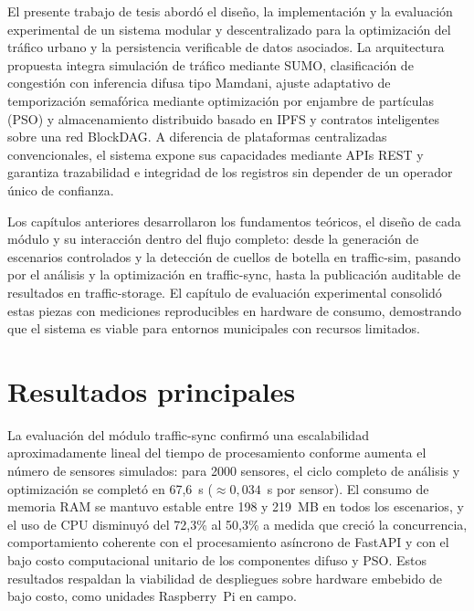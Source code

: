 
El presente trabajo de tesis abordó el diseño, la implementación y la evaluación experimental
de un sistema modular y descentralizado para la optimización del tráfico urbano y la
persistencia verificable de datos asociados. La arquitectura propuesta integra simulación de
tráfico mediante SUMO, clasificación de congestión con inferencia difusa tipo Mamdani,
ajuste adaptativo de temporización semafórica mediante optimización por enjambre de partículas
(PSO) y almacenamiento distribuido basado en IPFS y contratos inteligentes sobre una red
BlockDAG. A diferencia de plataformas centralizadas convencionales, el sistema expone sus
capacidades mediante APIs REST y garantiza trazabilidad e integridad de los registros sin
depender de un operador único de confianza.

Los capítulos anteriores desarrollaron los fundamentos teóricos, el diseño de cada módulo y
su interacción dentro del flujo completo: desde la generación de escenarios controlados y la
detección de cuellos de botella en traffic-sim, pasando por el análisis y la
optimización en traffic-sync, hasta la publicación auditable de resultados en
traffic-storage. El capítulo de evaluación experimental consolidó estas piezas con
mediciones reproducibles en hardware de consumo,
demostrando que el sistema es viable para entornos municipales con recursos limitados.

\section{Resultados principales}

La evaluación del módulo traffic-sync confirmó una escalabilidad aproximadamente
lineal del tiempo de procesamiento conforme aumenta el número de sensores simulados: para
2000 sensores, el ciclo completo de análisis y optimización se completó en 67,6~s
($\approx 0{,}034$~s por sensor). El consumo de memoria RAM se mantuvo estable entre
198 y 219~MB en todos los escenarios, y el uso de CPU disminuyó del 72,3\% al 50,3\% a
medida que creció la concurrencia, comportamiento coherente con el procesamiento asíncrono
de FastAPI y con el bajo costo computacional unitario de los componentes difuso y PSO.
Estos resultados respaldan la viabilidad de despliegues sobre hardware embebido de bajo costo,
como unidades Raspberry~Pi en campo.

